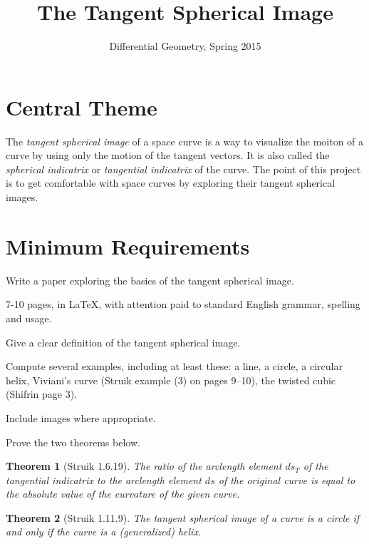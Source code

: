 \documentclass[12pt]{amsart}
\theoremstyle{plain}
\newtheorem*{theorem}{Theorem}
\begin{document}
\title{The Tangent Spherical Image}
\author{Differential Geometry, Spring 2015}

\maketitle

\section*{Central Theme}

The \emph{tangent spherical image} of a space curve is a way to visualize the moiton of a curve by using only the motion of the tangent vectors. It is also called the \emph{spherical indicatrix} or \emph{tangential indicatrix} of the curve. The point of this project is to get comfortable with space curves by exploring their tangent spherical images. 

\section*{Minimum Requirements}

Write a paper exploring the basics of the tangent spherical image. 
\begin{compactitem}
\item 7-10 pages, in \LaTeX, with attention paid to standard English grammar, spelling and usage.
\item Give a clear definition of the tangent spherical image.
\item Compute several examples, including at least these: a line, a circle, a circular helix, Viviani's curve (Struik example (3) on pages 9--10), the twisted cubic (Shifrin page 3).
\item Include images where appropriate.
\item Prove the two theorems below.
\end{compactitem}

\begin{theorem} [Struik 1.6.19] The ratio of the arclength element $ds_T$ of the tangential indicatrix to the arclength element $ds$ of the original curve is equal to the absolute value of the curvature of the given curve.
\end{theorem}

\begin{theorem} [Struik 1.11.9] The tangent spherical image of a curve is a circle if and only if the curve is a (generalized) helix.
\end{theorem}
\end{document}

